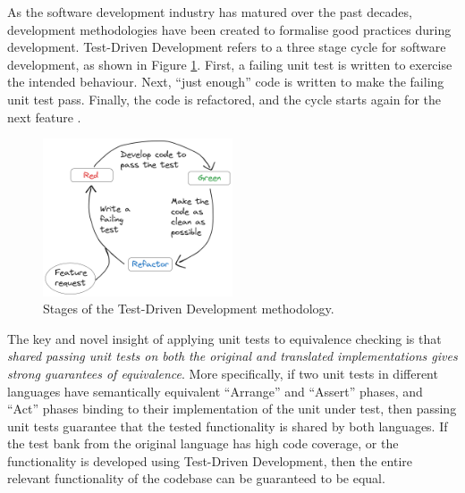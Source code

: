 As the software development industry has matured over the past decades, development methodologies have been created to formalise good practices during development. Test-Driven Development refers to a three stage cycle for software development, as shown in Figure \ref{fig:excalidraw_tdd}. First, a failing unit test is written to exercise the intended behaviour. Next, ``just enough'' code is written to make the failing unit test pass. Finally, the code is refactored, and the cycle starts again for the next feature \cite{beckTestDrivenDevelopment2022}.

\begin{figure}[H]
    \centering
    \includegraphics[width=0.5\textwidth]{images/3_translation/excalidraw_tdd.png}
    \caption{Stages of the Test-Driven Development methodology.}
    \label{fig:excalidraw_tdd}
\end{figure}

The key and novel insight of applying unit tests to equivalence checking is that \textit{shared passing unit tests on both the original and translated implementations gives strong guarantees of equivalence}. More specifically, if two unit tests in different languages have semantically equivalent ``Arrange'' and ``Assert'' phases, and ``Act'' phases binding to their implementation of the unit under test, then passing unit tests guarantee that the tested functionality is shared by both languages. If the test bank from the original language has high code coverage, or the functionality is developed using Test-Driven Development, then the entire relevant functionality of the codebase can be guaranteed to be equal.


